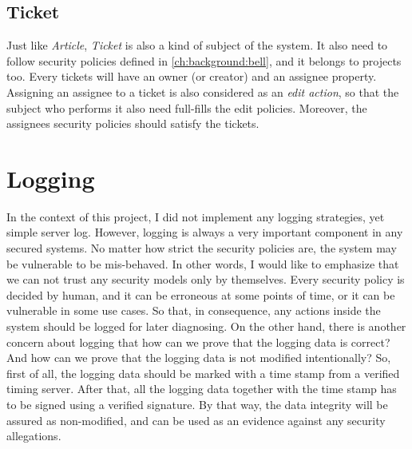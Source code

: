 
\subsection{Ticket}
\label{ch:hopot_project:ticket}

Just like \emph{Article}, \emph{Ticket} is also a kind of subject of the system.
It also need to follow security policies defined in \autoref{ch:background:bell}, and it belongs to projects too.
Every tickets will have an owner (or creator) and an assignee property.
Assigning an assignee to a ticket is also considered as an \emph{edit action}, so that the subject who performs it also need full-fills the edit policies.
Moreover, the assignees security policies should satisfy the tickets.


\section{Logging}
\label{ch:hopot_project:logging}

In the context of this project, I did not implement any logging strategies, yet simple server log.
However, logging is always a very important component in any secured systems. 
No matter how strict the security policies are, the system may be vulnerable to be mis-behaved.
In other words, I would like to emphasize that we can not trust any security models only by themselves.
Every security policy is decided by human, and it can be erroneous at some points of time, or it can be vulnerable in some use cases.
So that, in consequence, any actions inside the system should be logged for later diagnosing.
On the other hand, there is another concern about logging that how can we prove that the logging data is correct?
And how can we prove that the logging data is not modified intentionally?
So, first of all, the logging data should be marked with a time stamp from a verified timing server.
After that, all the logging data together with the time stamp has to be signed using a verified signature.
By that way, the data integrity will be assured as non-modified, and can be used as an evidence against any security allegations.
